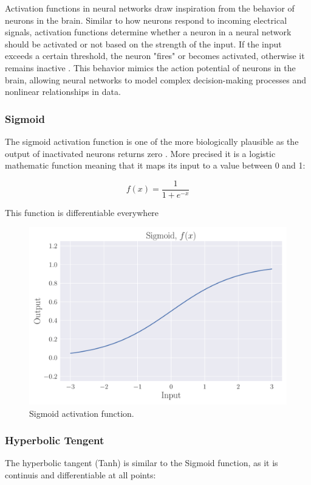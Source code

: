 \documentclass[a4paper, UKenglish, 11pt]{uiomaster}
\begin{document}
Activation functions in neural networks draw inspiration from the behavior of neurons in the brain. Similar to how neurons respond to incoming electrical signals, activation functions determine whether a neuron in a neural network should be activated or not based on the strength of the input. If the input exceeds a certain threshold, the neuron "fires" or becomes activated, otherwise it remains inactive \cite{analyticsvidhya_activationfunctions}. This behavior mimics the action potential of neurons in the brain, allowing neural networks to model complex decision-making processes and nonlinear relationships in data.


\subsubsection{Sigmoid}
The sigmoid activation function is one of the more biologically plausible as the output of inactivated neurons returns zero \cite{Jensen2022}. More precised it is a logistic mathematic function meaning that it maps its input to a value between 0 and 1:

\begin{equation}
  f(x) = \frac{1}{1 + e^{-x}}
\label{eq:Sigmoid}
\end{equation}

This function is differentiable everywhere

\begin{figure}
    \centering
    \includegraphics[width=\linewidth]{figures/Sigmoid.pdf}
    \caption{Sigmoid activation function.}
    \label{fig:sigmoid}
\end{figure}

\subsubsection{Hyperbolic Tengent}
The hyperbolic tangent (Tanh) is similar to the Sigmoid function, as it is continuis and differentiable at all points:
\end{document}
